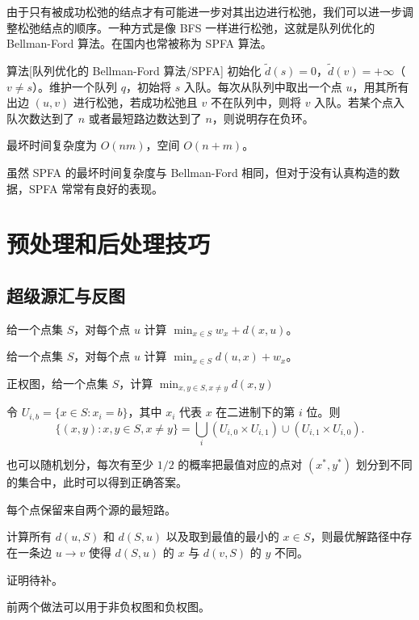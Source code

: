 由于只有被成功松弛的结点才有可能进一步对其出边进行松弛，我们可以进一步调整松弛结点的顺序。一种方式是像 BFS 一样进行松弛，这就是队列优化的 Bellman-Ford 算法。在国内也常被称为 SPFA 算法。
\begin{descbox}{算法}[队列优化的 Bellman-Ford 算法/SPFA]
    初始化 $\tilde d(s)=0$，$\tilde d(v)=+\infty$（$v\ne s$）。维护一个队列 $q$，初始将 $s$ 入队。每次从队列中取出一个点 $u$，用其所有出边 $(u,v)$ 进行松弛，若成功松弛且 $v$ 不在队列中，则将 $v$ 入队。若某个点入队次数达到了 $n$ 或者最短路边数达到了 $n$，则说明存在负环。

    最坏时间复杂度为 $O(nm)$，空间 $O(n+m)$。
\end{descbox}
\begin{remark}
    虽然 SPFA 的最坏时间复杂度与 Bellman-Ford 相同，但对于没有认真构造的数据，SPFA 常常有良好的表现。
\end{remark}

\section{预处理和后处理技巧}

\subsection{超级源汇与反图}

\begin{example}
    给一个点集 $S$，对每个点 $u$ 计算 $\min_{x\in S}w_x+d(x,u)$。
\end{example}

\begin{example}
    给一个点集 $S$，对每个点 $u$ 计算 $\min_{x\in S}d(u,x)+w_x$。
\end{example}

\begin{exercise}
    正权图，给一个点集 $S$，计算 $\min_{x,y\in S,x\ne y}d(x,y)$
\end{exercise}
\begin{solution}
    令 $U_{i,b}=\{x\in S:x_i=b\}$，其中 $x_i$ 代表 $x$ 在二进制下的第 $i$ 位。则
    $$
    \{(x,y):x,y\in S,x\ne y\}=\bigcup_i (U_{i,0}\times U_{i,1})\cup(U_{i,1}\times U_{i,0}).
    $$ 

    也可以随机划分，每次有至少 $1/2$ 的概率把最值对应的点对 $(x^*,y^*)$ 划分到不同的集合中，此时可以得到正确答案。
\end{solution}
\begin{solution}[做法二]
    每个点保留来自两个源的最短路。
\end{solution}
\begin{solution}[做法三]
    计算所有 $d(u,S)$ 和 $d(S,u)$ 以及取到最值的最小的 $x\in S$，则最优解路径中存在一条边 $u\to v$ 使得 $d(S,u)$ 的 $x$ 与 $d(v,S)$ 的 $y$ 不同。

    证明待补。
\end{solution}
\begin{remark}
    前两个做法可以用于非负权图和负权图。
\end{remark}


